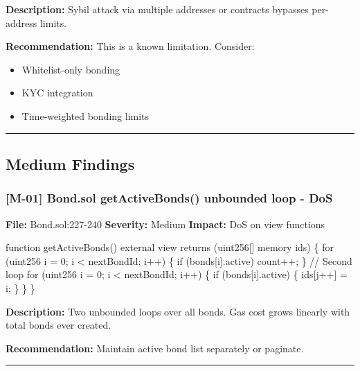 \documentclass[
]{article}
\newenvironment{Shaded}{}{}
\newcommand{\NormalTok}[1]{#1}
\providecommand{\tightlist}{%
  \setlength{\itemsep}{0pt}\setlength{\parskip}{0pt}}
\begin{document}
\textbf{Description:} Sybil attack via multiple addresses or contracts
bypasses per-address limits.

\textbf{Recommendation:} This is a known limitation. Consider:

\begin{itemize}
\tightlist
\item
  Whitelist-only bonding
\item
  KYC integration
\item
  Time-weighted bonding limits
\end{itemize}

\begin{center}\rule{0.5\linewidth}{0.5pt}\end{center}

\subsection{Medium Findings}\label{medium-findings}

\subsubsection{{[}M-01{]} Bond.sol getActiveBonds() unbounded loop -
DoS}\label{m-01-bondsol-getactivebonds-unbounded-loop---dos}

\textbf{File:} Bond.sol:227-240 \textbf{Severity:} Medium
\textbf{Impact:} DoS on view functions

\begin{Shaded}
\begin{Highlighting}[]
\NormalTok{function getActiveBonds() external view returns (uint256[] memory ids) \{}
\NormalTok{    for (uint256 i = 0; i \textless{} nextBondId; i++) \{}
\NormalTok{        if (bonds[i].active) count++;}
\NormalTok{    \}}
\NormalTok{    // Second loop}
\NormalTok{    for (uint256 i = 0; i \textless{} nextBondId; i++) \{}
\NormalTok{        if (bonds[i].active) \{}
\NormalTok{            ids[j++] = i;}
\NormalTok{        \}}
\NormalTok{    \}}
\NormalTok{\}}
\end{Highlighting}
\end{Shaded}

\textbf{Description:} Two unbounded loops over all bonds. Gas cost grows
linearly with total bonds ever created.

\textbf{Recommendation:} Maintain active bond list separately or
paginate.

\begin{center}\rule{0.5\linewidth}{0.5pt}\end{center}
\end{document}

